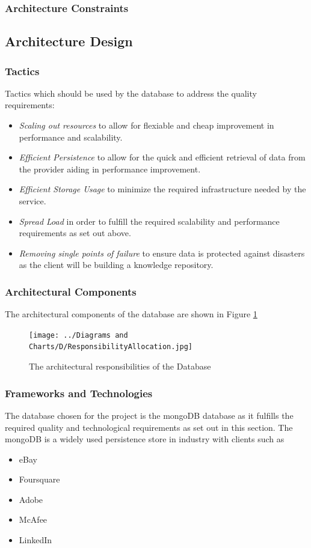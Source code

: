 \subsubsection{Architecture Constraints}
\subsection{Architecture Design}
\subsubsection{Tactics}
Tactics which should be used by the database to address the quality requirements:
\begin{itemize}
	\item \textit{Scaling out resources} to allow for flexiable and cheap
		improvement in performance and scalability.
	\item \textit{Efficient Persistence} to allow for the quick and efficient
		retrieval of data from the provider aiding in performance
		improvement.
	\item \textit{Efficient Storage Usage} to minimize the required
	infrastructure needed by the service.
	\item \textit{Spread Load} in order to fulfill the required scalability
		and performance requirements as set out above.
	\item \textit{Removing single points of failure} to ensure data is
		protected against disasters as the client will be building a
		knowledge repository.
\end{itemize}

\subsubsection{Architectural Components}
The architectural components of the database are shown in 
Figure \ref{fig:databaseResponsibilityAllocation}
\begin{figure}[H]
	\begin{center}
	\texttt{[image: ../Diagrams and Charts/D/ResponsibilityAllocation.jpg]}
	\caption{The architectural responsibilities of the Database}
	\label{fig:databaseResponsibilityAllocation}
	\end{center}
\end{figure}

\subsubsection{Frameworks and Technologies}
The database chosen for the project is the mongoDB database as it fulfills the
required quality and technological requirements as set out in this section. The
mongoDB is a widely used persistence store in industry with clients such as
\begin{itemize}
	\item eBay
	\item Foursquare
	\item Adobe
	\item McAfee
	\item LinkedIn
\end{itemize}

